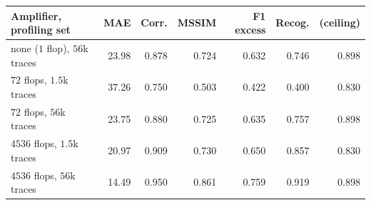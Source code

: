 \begin{tabular}{lrrrrrr}
\hline
Amplifier, profiling set & MAE & Corr. & MSSIM & F1 excess & Recog. & (ceiling) \\
\hline
none ($1$ flop), $56$k traces & 23.98 & 0.878 & 0.724 & 0.632 & 0.746 & 0.898 \\
$72$ flops, $1.5$k traces & 37.26 & 0.750 & 0.503 & 0.422 & 0.400 & 0.830 \\
$72$ flops, $56$k traces & 23.75 & 0.880 & 0.725 & 0.635 & 0.757 & 0.898 \\
$4536$ flops, $1.5$k traces & 20.97 & 0.909 & 0.730 & 0.650 & 0.857 & 0.830 \\
$4536$ flops, $56$k traces & 14.49 & 0.950 & 0.861 & 0.759 & 0.919 & 0.898 \\
\hline
\end{tabular}
